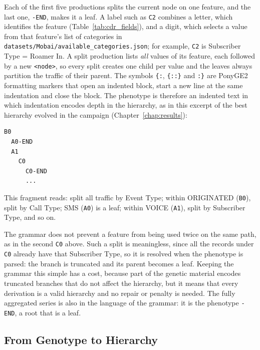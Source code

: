 Each of the first five productions splits the current node on one feature, and the last one, \texttt{-END}, makes it a leaf.
A label such as \texttt{C2} combines a letter, which identifies the feature (Table~\ref{tab:cdr_fields}), and a digit, which selects a value from that feature's list of categories in \texttt{datasets/Mobai/available\_categories.json}; for example, \texttt{C2} is Subscriber Type = Roamer In.
A split production lists \emph{all} values of its feature, each followed by a new \texttt{<node>}, so every split creates one child per value and the leaves always partition the traffic of their parent.
The symbols \texttt{\{:}, \texttt{\{::\}} and \texttt{:\}} are PonyGE2 formatting markers that open an indented block, start a new line at the same indentation and close the block.
The phenotype is therefore an indented text in which indentation encodes depth in the hierarchy, as in this excerpt of the best hierarchy evolved in the campaign (Chapter~\ref{chap:results}):

\begin{lstlisting}[basicstyle=\ttfamily\small, columns=fullflexible, frame=single]
B0
  A0-END
  A1
    C0
      C0-END
      ...
\end{lstlisting}

This fragment reads: split all traffic by Event Type; within ORIGINATED (\texttt{B0}), split by Call Type; SMS (\texttt{A0}) is a leaf; within VOICE (\texttt{A1}), split by Subscriber Type, and so on.

The grammar does not prevent a feature from being used twice on the same path, as in the second \texttt{C0} above.
Such a split is meaningless, since all the records under \texttt{C0} already have that Subscriber Type, so it is resolved when the phenotype is parsed: the branch is truncated and its parent becomes a leaf.
Keeping the grammar this simple has a cost, because part of the genetic material encodes truncated branches that do not affect the hierarchy, but it means that every derivation is a valid hierarchy and no repair or penalty is needed.
The fully aggregated series is also in the language of the grammar: it is the phenotype \texttt{-END}, a root that is a leaf.

\subsection{From Genotype to Hierarchy}


